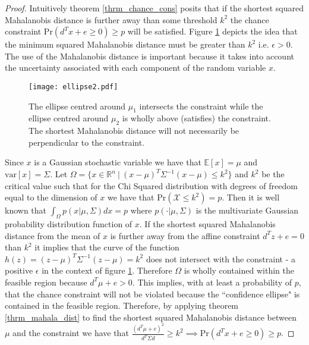 \begin{proof}
Intuitively theorem \ref{thrm_chance_cons} posits that if the shortest squared Mahalanobis distance is further away than some threshold $k^2$ the chance constraint $\text{Pr}(d^Tx + e \geq 0) \geq p$ will be satisfied. Figure \ref{fig_mahala_ellipse} depicts the idea that the minimum squared Mahalanobis distance must be greater than $k^2$ i.e. $\epsilon > 0$. The use of the Mahalanobis distance is important because it takes into account the uncertainty associated with each component of the random variable $x$.  
\begin{figure}[H] 
\centering
\texttt{[image: ellipse2.pdf]}
\caption{The ellipse centred around $\mu_1$ intersects the constraint while the ellipse centred around $\mu_2$ is wholly above (satisfies) the constraint. The shortest Mahalanobis distance will not necessarily be perpendicular to the constraint.}
\label{fig_mahala_ellipse}
\end{figure}
Since $x$ is a Gaussian stochastic variable we have that $\mathbb{E}[x] =\mu$ and $\text{var}[x]=\Sigma$. Let $\Omega = \{x \in \mathbb{R}^n~|~(x-\mu)^T\Sigma^{-1}(x-\mu) \leq k^2\}$ and $k^2$ be the critical value such that for the Chi Squared distribution with degrees of freedom equal to the dimension of $x$ we have that $\text{Pr}(\mathcal{X} \leq k^2) = p$. Then it is well known \cite{mahala2} that $\int_{\Omega}p(x|\mu, \Sigma)dx = p$ where $p(\cdot|\mu, \Sigma)$ is the multivariate Gaussian probability distribution function of $x$. If the shortest squared Mahalanobis distance from the mean of $x$ is further away from the affine constraint $d^Tz+e=0$ than $k^2$ it implies that the curve of the function $h(z) = (z-\mu)^T\Sigma^{-1}(z-\mu) = k^2$ does not intersect with the constraint - a positive $\epsilon$ in the context of figure \ref{fig_mahala_ellipse}. Therefore $\Omega$ is wholly contained within the feasible region because $d^T\mu+e> 0 $. This implies, with at least a probability of $p$, that the chance constraint will not be violated because the ``confidence ellipse" is contained in the feasible region. Therefore, by applying theorem \ref{thrm_mahala_dist} to find the shortest squared Mahalanobis distance between $\mu$ and the constraint we have that $\frac{(d^T\mu+e)^2}{d^T \Sigma d} \geq k^2 \implies \text{Pr}(d^Tx + e \geq 0) \geq p$.


\end{proof}
